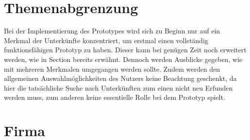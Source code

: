 \section{Themenabgrenzung}
Bei der Implementierung des Prototypes wird sich zu Beginn nur auf ein Merkmal der Unterkünfte konzentriert, um erstmal einen
vollständig funktionsfähigen Prototyp zu haben. Dieser kann bei genügen Zeit noch erweitert werden, wie in Section 
bereits erwähnt. Dennoch werden Ausblicke gegeben, wie mit mehreren Merkmalen umgegangen werden sollte. Zudem werden den allgemeinen Auswahlmöglichkeiten des Nutzers keine Beachtung geschenkt, da hier die tatsächliche Suche nach Unterkünften
zum einen nicht neu Erfunden werden muss, zum anderen keine essentielle Rolle bei dem Prototyp spielt.

\section{Firma}
